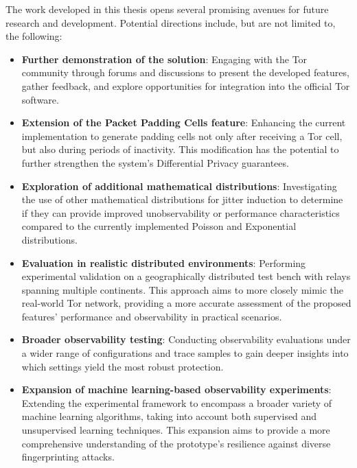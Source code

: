 The work developed in this thesis opens several promising avenues for future research and development. Potential directions include, but are not limited to, the following:
\begin{itemize}
    \item \textbf{Further demonstration of the solution}: Engaging with the Tor community through forums and discussions to present the developed features, gather feedback, and explore opportunities for integration into the official Tor software.
    \item \textbf{Extension of the Packet Padding Cells feature}: Enhancing the current implementation to generate padding cells not only after receiving a Tor cell, but also during periods of inactivity. This modification has the potential to further strengthen the system's Differential Privacy guarantees.
    \item \textbf{Exploration of additional mathematical distributions}: Investigating the use of other mathematical distributions for jitter induction to determine if they can provide improved unobservability or performance characteristics compared to the currently implemented Poisson and Exponential distributions.
    \item \textbf{Evaluation in realistic distributed environments}: Performing experimental validation on a geographically distributed test bench with relays spanning multiple continents. This approach aims to more closely mimic the real-world Tor network, providing a more accurate assessment of the proposed features' performance and observability in practical scenarios.
    \item \textbf{Broader observability testing}: Conducting observability evaluations under a wider range of configurations and trace samples to gain deeper insights into which settings yield the most robust protection.
    \item \textbf{Expansion of machine learning-based observability experiments}: Extending the experimental framework to encompass a broader variety of machine learning algorithms, taking into account both supervised and unsupervised learning techniques. This expansion aims to provide a more comprehensive understanding of the prototype's resilience against diverse fingerprinting attacks.
\end{itemize}
